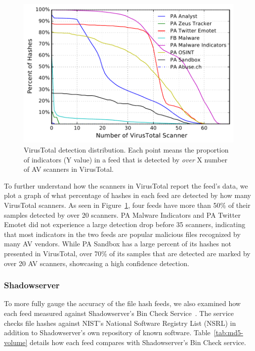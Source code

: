 \begin{figure}[t]
\includegraphics[width=0.95\columnwidth]{images/hash_vt_cdf.pdf}
\caption{VirusTotal detection distribution. Each point means the proportion of indicators (Y value) in a feed that is detected by \textit{over} X number of AV scanners in VirusTotal.}
\label{fig:vt-cdf}
\end{figure}

To further understand how the scanners in VirusTotal report the feed's data,
we plot a graph of what percentage of hashes in each feed are detected by how many
VirusTotal scanners. As seen in Figure~\ref{fig:vt-cdf}, four feeds have more
than 50\% of their samples detected by over 20 scanners. PA Malware Indicators
and PA Twitter Emotet did not experience a large detection drop before 35 scanners,
indicating that most indicators in the two feeds are popular malicious files
recognized by many AV vendors. While PA Sandbox has a large percent of its hashes
not presented in VirusTotal, over 70\% of its samples that are detected are marked
by over 20 AV scanners, showcasing a high confidence detection.

\subsubsection{Shadowserver}

To more fully gauge the accuracy of the file hash feeds,
we also examined how each feed measured against Shadowserver's Bin Check
Service~\cite{shadowserver}. The service checks file hashes against NIST's
National Software Registry List (NSRL) in addition to Shadowserver's own repository of
known software. Table~\ref{tab:md5-volume} details how each feed compares with
Shadowserver's Bin Check service.

